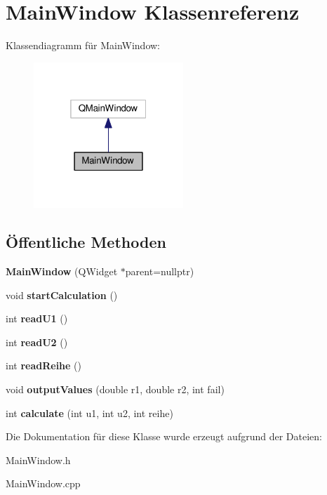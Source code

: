 \hypertarget{classMainWindow}{}\section{Main\+Window Klassenreferenz}
\label{classMainWindow}


Klassendiagramm für Main\+Window\+:\nopagebreak
\begin{figure}[H]
\begin{center}
\leavevmode
\includegraphics[width=160pt]{classMainWindow__inherit__graph}
\end{center}
\end{figure}
\subsection*{Öffentliche Methoden}
\begin{DoxyCompactItemize}
\item 
{\bfseries Main\+Window} (Q\+Widget $\ast$parent=nullptr)\hypertarget{classMainWindow_a996c5a2b6f77944776856f08ec30858d}{}\label{classMainWindow_a996c5a2b6f77944776856f08ec30858d}

\item 
void {\bfseries start\+Calculation} ()\hypertarget{classMainWindow_a2928be63df3071466644eca76d6e32a7}{}\label{classMainWindow_a2928be63df3071466644eca76d6e32a7}

\item 
int {\bfseries read\+U1} ()\hypertarget{classMainWindow_a3b94ad2c855f6a0df3579c48b1a6f6fd}{}\label{classMainWindow_a3b94ad2c855f6a0df3579c48b1a6f6fd}

\item 
int {\bfseries read\+U2} ()\hypertarget{classMainWindow_ab9a4bb81031d0bcb5cc5d181a26f3429}{}\label{classMainWindow_ab9a4bb81031d0bcb5cc5d181a26f3429}

\item 
int {\bfseries read\+Reihe} ()\hypertarget{classMainWindow_a4869d3468f1124ae508be8e177b66ed3}{}\label{classMainWindow_a4869d3468f1124ae508be8e177b66ed3}

\item 
void {\bfseries output\+Values} (double r1, double r2, int fail)\hypertarget{classMainWindow_a12b9bbad12422386cec9da99c2ea3d57}{}\label{classMainWindow_a12b9bbad12422386cec9da99c2ea3d57}

\item 
int {\bfseries calculate} (int u1, int u2, int reihe)\hypertarget{classMainWindow_ab0f78571621e4f8e82f51464648cf017}{}\label{classMainWindow_ab0f78571621e4f8e82f51464648cf017}

\end{DoxyCompactItemize}


Die Dokumentation für diese Klasse wurde erzeugt aufgrund der Dateien\+:\begin{DoxyCompactItemize}
\item 
Main\+Window.\+h\item 
Main\+Window.\+cpp\end{DoxyCompactItemize}
